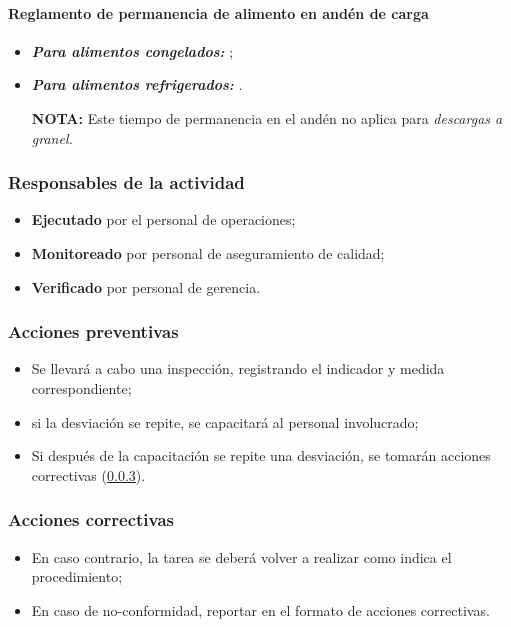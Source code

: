 \paragraph{Reglamento de permanencia de alimento en andén de carga}
\begin{itemize}
	\item \emph{\textbf{Para alimentos congelados:}} \TiempoAndenCong;
	\item \emph{\textbf{Para alimentos refrigerados:}} \TiempoAndenRefri.
	\item[\textbf{NOTA:}] Este tiempo de permanencia en el andén no aplica para \emph{descargas a granel.}
\end{itemize}

\subsubsection{Responsables de la actividad}
\begin{itemize}
	\item \textbf{Ejecutado} por el personal de operaciones;
	\item \textbf{Monitoreado} por personal de aseguramiento de calidad;
	\item \textbf{Verificado} por personal de gerencia.
\end{itemize}

\subsubsection{Acciones preventivas}
\begin{itemize}
	\item Se llevará a cabo una inspección, registrando el indicador y medida correspondiente;
	\item si la desviación se repite, se capacitará al personal involucrado;
	\item Si después de la capacitación se repite una desviación, se tomarán acciones correctivas (\cref{sec:2.1:acc}).
\end{itemize}

\subsubsection{Acciones correctivas}
\label{sec:2.1:acc}
\begin{itemize}
	\item En caso contrario, la tarea se deberá volver a realizar como indica el procedimiento;
	\item En caso de no-conformidad, reportar en el formato de acciones correctivas.
\end{itemize}

